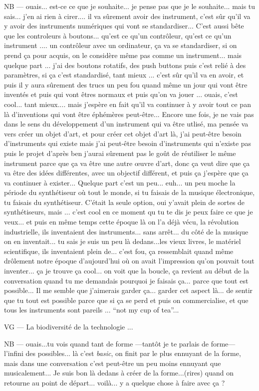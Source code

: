 NB — ouais... est-ce ce que je souhaite... je pense pas que je le souhaite... mais tu sais... j'en ai rien à cirer....  il va sûrement avoir des instrument, c'est sûr qu'il va y avoir des instruments numériques qui vont se standardiser... C'est aussi bête que les controleurs à boutons... qu'est ce qu'un contrôleur, qu'est ce qu'un instrument .... un contrôleur avec un ordinateur, ça va se standardiser, si on prend ça pour acquis, on le considère même pas comme un instrument...  mais quelque part ... j'ai des boutons rotatifs, des push buttons puis c'est relié à des paramètres, si ça c'est standardisé, tant mieux ... c'est sûr qu'il va en avoir, et puis il y aura sûrement des trucs un peu fou quand même un jour qui vont être inventés et puis qui vont êtres normaux et puis qu'on va jouer ... ouais, c'est cool... tant mieux....  mais j'espère en fait qu'il va continuer à y avoir tout ce pan là d'inventions qui vont être éphémères peut-être... Encore une fois, je ne vais pas dans le sens du développement d'un instrument qui va être utlisé, ma pensée va vers créer un objet d'art, et pour créer cet objet d'art là, j'ai peut-être besoin d'instruments qui existe mais j'ai peut-être besoin d'instruments qui n'existe pas puis le projet d'après ben j'aurai sûrement pas le goût de réutiliser le même instrument parce que ça va être une autre œuvre d'art, donc ça veut dire que ça va être des idées différentes, avec un objectif différent, et puis ça j'espère que ça va continuer à exister... Quelque part c'est un peu... euh... un peu moche la période du synthétiseur où tout le monde, si tu faisais de la musique électronique, tu faisais du synthétiseur. C'était la seule option, oui y'avait plein de sortes de synthétiseurs, mais ... c'est cool en ce moment qu tu te dis je peux faire ce que je veux... et puis en même temps cette époque là on l'a déjà vécu, la révolution industrielle, ils inventaient des instruments... sans arrêt... du côté de la musique on en inventait... tu sais je suis un peu là dedans...les vieux livres, le matériel scientifique, ils inventaient plein de... c'est fou, ça ressemblait quand même drôlement notre époque d'aujourd'hui où on avait l'impression qu'on pouvait tout inventer...  ça je trouve ça cool... on voit que la boucle, ça revient au début de la conversation quand tu me demandais pourquoi je faisais ça... parce que tout est possible... Il me semble que j'aimerais garder ça... garder cet aspect là... de sentir que tu tout est possible parce que si ça se perd et puis on commercialise, et que tous les instruments sont pareils ... ``not my cup of tea''... 

VG — La biodiversité de la technologie ...

NB — ouais...tu vois quand tant de forme —tantôt je te parlais de forme— l'infini des possibles... là c'est \textit{basic}, on finit par le plus ennuyant de la forme, mais dans une conversation c'est peut-être un peu moins ennuyant que musicalement... Je suis bon là dedans à créer de la forme...(rires) quand on retourne au point de départ... voilà... y a quelque chose à faire avec ça ?



